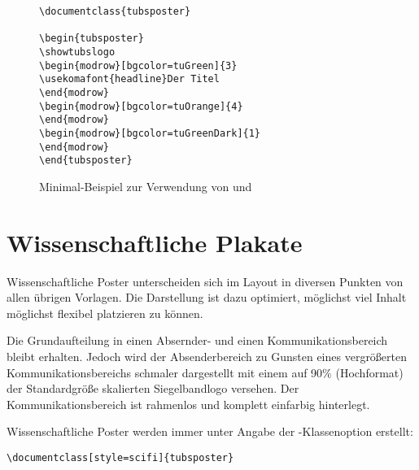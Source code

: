 \begin{figure}[!ht]
\begin{minipage}{0.65\textwidth}
\begin{lstlisting}
\documentclass{tubsposter}

\begin{tubsposter}
\showtubslogo
\begin{modrow}[bgcolor=tuGreen]{3}
\usekomafont{headline}Der Titel
\end{modrow}
\begin{modrow}[bgcolor=tuOrange]{4}
\end{modrow}
\begin{modrow}[bgcolor=tuGreenDark]{1}
\end{modrow}
\end{tubsposter}

\end{lstlisting}
\end{minipage}
\begin{minipage}{0.35\textwidth}
\end{minipage}
\caption{Minimal-Beispiel zur Verwendung von  und
  }
\end{figure}


\clearpage
\section{Wissenschaftliche Plakate}

Wissenschaftliche Poster unterscheiden sich im Layout in diversen Punkten
von allen übrigen Vorlagen. Die Darstellung ist dazu optimiert, möglichst
viel Inhalt möglichst flexibel platzieren zu können.

Die Grundaufteilung in einen Absernder- und einen Kommunikationsbereich 
bleibt erhalten.
Jedoch wird der Absenderbereich zu Gunsten eines vergrößerten Kommunikationsbereichs
schmaler dargestellt mit einem auf 90\% (Hochformat) der Standardgröße
skalierten Siegelbandlogo versehen.
Der Kommunikationsbereich ist rahmenlos und komplett einfarbig hinterlegt.

Wissenschaftliche Poster werden immer unter Angabe der -Klassenoption
 erstellt:
\begin{lstlisting}
\documentclass[style=scifi]{tubsposter}
\end{lstlisting}

